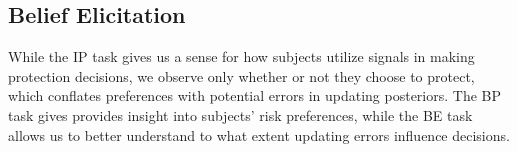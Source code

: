 \documentclass[12pt,a4paper]{article}
\begin{document}
\begin{table}[H]\centering 
\caption{Average Protection by Signal Type} 
\label{tab:nonparIP}
\end{table}



\subsection{Belief Elicitation}
While the IP task gives us a sense for how subjects utilize signals in making protection decisions, we observe only whether or not they choose to protect, which conflates preferences with potential errors in updating posteriors.  The BP task gives provides insight into subjects' risk preferences, while the BE task allows us to better understand to what extent updating errors influence decisions.  
\end{document}
